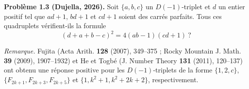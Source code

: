 \textbf{Problème 1.3 (Dujella, 2026).} Soit $\{a,b,c\}$ un $D(-1)$-triplet et $d$ un entier positif tel que $ad+1$, $bd+1$ et $cd+1$ soient des carrés parfaits. Tous ces quadruplets vérifient-ils la formule
\[
(d+a+b-c)^2 = 4(ab-1)(cd+1)\ ?
\]

\medskip

\textit{Remarque.} Fujita (Acta Arith. \textbf{128} (2007), 349--375 ; Rocky Mountain J. Math. \textbf{39} (2009), 1907--1932) et He et Togbé (J. Number Theory \textbf{131} (2011), 120--137) ont obtenu une réponse positive pour les $D(-1)$-triplets de la forme $\{1,2,c\}$, $\{F_{2k+1}, F_{2k+3}, F_{2k+5}\}$ et $\{1, k^2+1, k^2+2k+2\}$, respectivement.
